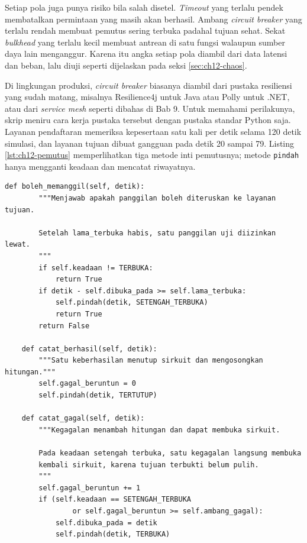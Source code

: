 Setiap pola juga punya risiko bila salah disetel. \textit{Timeout} yang terlalu pendek membatalkan
permintaan yang masih akan berhasil. Ambang \textit{circuit breaker} yang terlalu rendah membuat
pemutus sering terbuka padahal tujuan sehat. Sekat \textit{bulkhead} yang terlalu kecil membuat
antrean di satu fungsi walaupun sumber daya lain menganggur. Karena itu angka setiap pola diambil
dari data latensi dan beban, lalu diuji seperti dijelaskan pada seksi \ref{sec:ch12-chaos}.

\begin{pendalaman}[title={Pendalaman Teknis (opsional): Mensimulasikan Circuit Breaker}]
  Di lingkungan produksi, \textit{circuit breaker} biasanya diambil dari pustaka resiliensi yang
  sudah matang, misalnya Resilience4j untuk Java atau Polly untuk .NET, atau dari
  \textit{service mesh} seperti dibahas di Bab 9. Untuk memahami perilakunya, skrip
   meniru cara kerja pustaka tersebut
  dengan pustaka standar Python saja. Layanan pendaftaran memeriksa kepesertaan satu kali per
  detik selama 120 detik simulasi, dan layanan tujuan dibuat gangguan pada detik 20 sampai 79.
  Listing \ref{lst:ch12-pemutus} memperlihatkan tiga metode inti pemutusnya; metode
  \texttt{pindah} hanya mengganti keadaan dan mencatat riwayatnya.

\begin{lstlisting}[style=ch12python, gobble=4, columns=fullflexible, caption={Tiga metode inti kelas \texttt{PemutusSirkuit},
  tersedia di \berkas{sources/chapter12/simulasi-circuit-breaker.py}}, label={lst:ch12-pemutus}]
    def boleh_memanggil(self, detik):
        """Menjawab apakah panggilan boleh diteruskan ke layanan tujuan.

        Setelah lama_terbuka habis, satu panggilan uji diizinkan lewat.
        """
        if self.keadaan != TERBUKA:
            return True
        if detik - self.dibuka_pada >= self.lama_terbuka:
            self.pindah(detik, SETENGAH_TERBUKA)
            return True
        return False

    def catat_berhasil(self, detik):
        """Satu keberhasilan menutup sirkuit dan mengosongkan hitungan."""
        self.gagal_beruntun = 0
        self.pindah(detik, TERTUTUP)

    def catat_gagal(self, detik):
        """Kegagalan menambah hitungan dan dapat membuka sirkuit.

        Pada keadaan setengah terbuka, satu kegagalan langsung membuka
        kembali sirkuit, karena tujuan terbukti belum pulih.
        """
        self.gagal_beruntun += 1
        if (self.keadaan == SETENGAH_TERBUKA
                or self.gagal_beruntun >= self.ambang_gagal):
            self.dibuka_pada = detik
            self.pindah(detik, TERBUKA)
\end{lstlisting}


\end{pendalaman}
